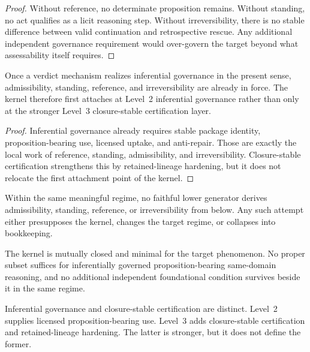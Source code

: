\begin{proof}
Without reference, no determinate proposition remains. Without standing, no act qualifies as a licit reasoning step. Without irreversibility, there is no stable difference between valid continuation and retrospective rescue. Any additional independent governance requirement would over-govern the target beyond what assessability itself requires.
\end{proof}

\begin{theorem}
Once a verdict mechanism realizes inferential governance in the present sense, admissibility, standing, reference, and irreversibility are already in force. The kernel therefore first attaches at Level~2 inferential governance rather than only at the stronger Level~3 closure-stable certification layer.
\end{theorem}

\begin{proof}
Inferential governance already requires stable package identity, proposition-bearing use, licensed uptake, and anti-repair. Those are exactly the local work of reference, standing, admissibility, and irreversibility. Closure-stable certification strengthens this by retained-lineage hardening, but it does not relocate the first attachment point of the kernel.
\end{proof}

\begin{theorem}
Within the same meaningful regime, no faithful lower generator derives admissibility, standing, reference, or irreversibility from below. Any such attempt either presupposes the kernel, changes the target regime, or collapses into bookkeeping.
\end{theorem}

\begin{theorem}
The kernel is mutually closed and minimal for the target phenomenon. No proper subset suffices for inferentially governed proposition-bearing same-domain reasoning, and no additional independent foundational condition survives beside it in the same regime.
\end{theorem}

\begin{theorem}
Inferential governance and closure-stable certification are distinct. Level~2 supplies licensed proposition-bearing use. Level~3 adds closure-stable certification and retained-lineage hardening. The latter is stronger, but it does not define the former.
\end{theorem}

